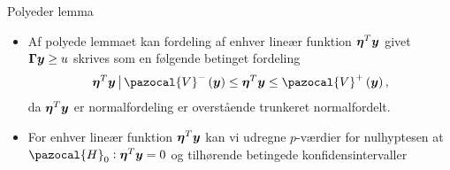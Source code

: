\begin{frame}{Polyeder lemma}
\begin{itemize}
\item Af polyede lemmaet kan fordeling af enhver lineær funktion $\boldsymbol \eta^T \bm{y}$ givet $\boldsymbol \Gamma \bm{y} \geq u$ skrives som en følgende betinget fordeling
\begin{align*}
\boldsymbol \eta^T \vy \given \pazocal{V}^- \del{\vy} \leq \boldsymbol \eta^T \vy \leq \pazocal{V}^+ \del{\vy}, 
\end{align*}
da $\boldsymbol \eta^T \bm{y} $ er normalfordeling er overstående trunkeret normalfordelt. 
\item For enhver lineær funktion $\boldsymbol \eta^T \bm{y} $ kan vi udregne $p$-værdier for nulhyptesen at $\pazocal{H}_0:\boldsymbol \eta^T \vy   = 0$ og tilhørende betingede konfidensintervaller
\end{itemize}
\end{frame}

